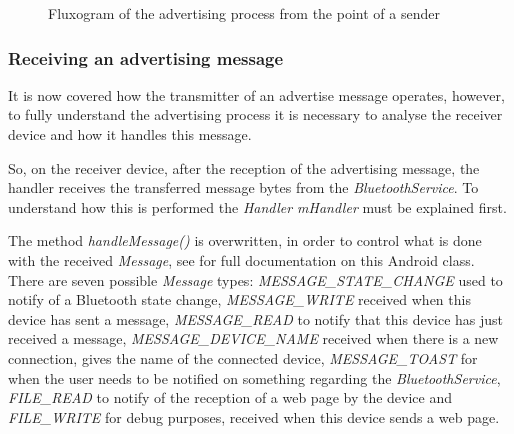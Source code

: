 \begin{figure}[ht]
   \noindent{}
	\caption{\label{fig:advflux} Fluxogram of the advertising process from the point of a sender}
\end{figure}

\subsubsection{Receiving an advertising message}
\label{subsubsec:rcvadv}

It is now covered how the transmitter of an advertise message operates, however, to fully understand the advertising process it is necessary to analyse the receiver device and how it handles this message.

So, on the receiver device, after the reception of the advertising message, the handler receives the transferred message bytes from the \textit{BluetoothService}. To understand how this is performed the \textit{Handler mHandler} must be explained first.

The method \textit{handleMessage()} is overwritten, in order to control what is done with the received \textit{Message}, see \cite{msgclass} for full documentation on this Android class. There are seven possible \textit{Message} types: \textit{MESSAGE\_STATE\_CHANGE} used to notify of a Bluetooth state change, \textit{MESSAGE\_WRITE} received when this device has sent a message, \textit{MESSAGE\_READ} to notify that this device has just received a message, \textit{MESSAGE\_DEVICE\_NAME} received when there is a new connection, gives the name of the connected device, \textit{MESSAGE\_TOAST} for when the user needs to be notified on something regarding the \textit{BluetoothService}, \textit{FILE\_READ} to notify of the reception of a web page by the device and \textit{FILE\_WRITE} for debug purposes, received when this device sends a web page.

